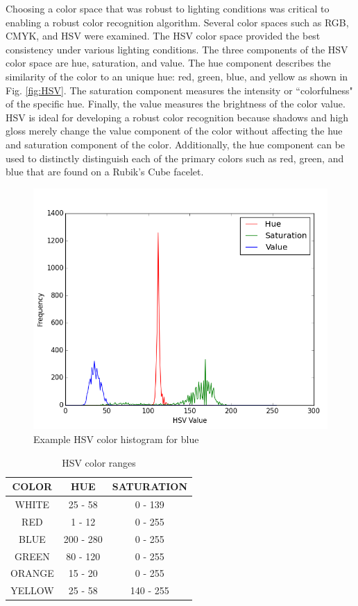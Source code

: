\documentclass[final, letterpaper, 10 pt, conference, twocolumn]{IEEEtran}
\begin{document}
Choosing a color space that was robust to lighting conditions was critical to enabling a robust color recognition algorithm. Several color spaces such as RGB, CMYK, and HSV were examined. The HSV color space provided the best consistency under various lighting conditions. The three components of the HSV color space are hue, saturation, and value. The hue component describes the similarity of the color to an unique hue: red, green, blue, and yellow as shown in Fig. \ref{fig:HSV}. The saturation component measures the intensity or ``colorfulness" of the specific hue. Finally, the value measures the brightness of the color value. HSV is ideal for developing a robust color recognition because shadows and high gloss merely change the value component of the color without affecting the hue and saturation component of the color. Additionally, the hue component can be used to distinctly distinguish each of the primary colors such as red, green, and blue that are found on a Rubik's Cube facelet.


\begin{figure}[!ht]
\centering
\includegraphics[scale=0.4]{example_blue_histogram.png}
\caption{Example HSV color histogram for blue}
\label{fig:Example Histogram}
\end{figure}

\begin{table}[!ht]
\caption{HSV color ranges}
\label{table:color ranges}
\centering
\begin{tabular}{|c|c|c|}
\hline
\textbf{COLOR} & \textbf{HUE} & \textbf{SATURATION} \\ \hline
WHITE          & 25 - 58  & 0 - 139               \\ \hline
RED            & 1  - 12     & 0 - 255            \\ \hline
BLUE           & 200 - 280   & 0 - 255              \\ \hline
GREEN          & 80 - 120   & 0 - 255            \\ \hline
ORANGE         & 15 - 20     & 0 - 255         \\ \hline
YELLOW         & 25 - 58   & 140 - 255            \\ \hline
\end{tabular}
\end{table}
\end{document}
